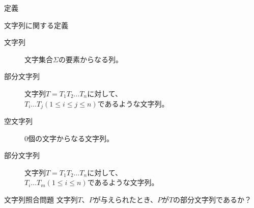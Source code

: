 \documentclass[dvipdfmx,12pt,beamer]{standalone}
\begin{document}
\begin{frame}{定義}
	\begin{block}{文字列に関する定義}
		\begin{description}
			\item[文字列] 文字集合$\Sigma$の要素からなる列。
			\item[部分文字列] 文字列$T= T_1T_2\ldots T_n$に対して、\\$T_i\ldots T_j (1 \le i \le j \le n)$であるような文字列。
			\item[空文字列] 0個の文字からなる文字列。
			\item[部分文字列] 文字列$T= T_1T_2\ldots T_n$に対して、\\$T_i\ldots T_m (1 \le i \le n)$であるような文字列。
		\end{description}
	\end{block}
	\begin{block}{文字列照合問題}
		文字列$T$、$P$が与えられたとき、$P$が$T$の部分文字列であるか？
	\end{block}
\end{frame}
\end{document}
